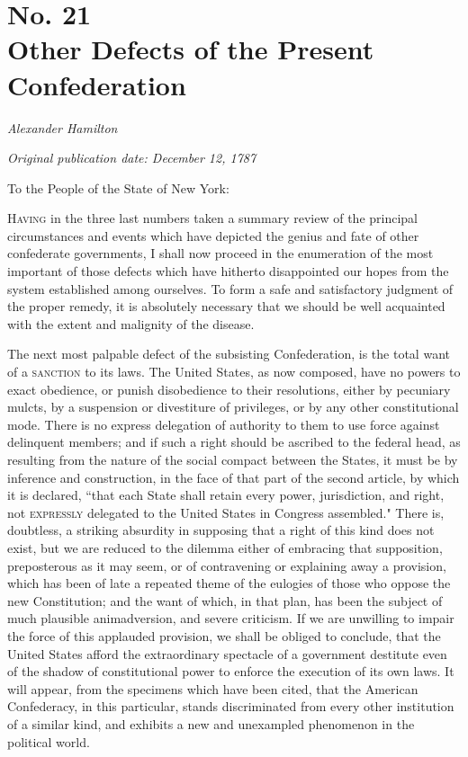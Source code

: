 \chapter[No. 21: Other Defects of the Present Confederation]{No. 21\\ {\small Other Defects of the Present Confederation}}

\textit{Alexander Hamilton}

\textit{Original publication date: December 12, 1787}
\vspace{1cm}

To the People of the State of New York:
\vspace{.4cm}

\textsc{Having} in the three last numbers taken a summary review of the principal circumstances and events which have depicted the genius and fate of other confederate governments, I shall now proceed in the enumeration of the most important of those defects which have hitherto disappointed our hopes from the system established among ourselves. 
To form a safe and satisfactory judgment of the proper remedy, it is absolutely necessary that we should be well acquainted with the extent and malignity of the disease.

The next most palpable defect of the subsisting Confederation, is the total want of a \textsc{sanction} to its laws. 
The United States, as now composed, have no powers to exact obedience, or punish disobedience to their resolutions, either by pecuniary mulcts, by a suspension or divestiture of privileges, or by any other constitutional mode. 
There is no express delegation of authority to them to use force against delinquent members; and if such a right should be ascribed to the federal head, as resulting from the nature of the social compact between the States, it must be by inference and construction, in the face of that part of the second article, by which it is declared, ``that each State shall retain every power, jurisdiction, and right, not \textsc{expressly} delegated to the United States in Congress assembled." There is, doubtless, a striking absurdity in supposing that a right of this kind does not exist, but we are reduced to the dilemma either of embracing that supposition, preposterous as it may seem, or of contravening or explaining away a provision, which has been of late a repeated theme of the eulogies of those who oppose the new Constitution; and the want of which, in that plan, has been the subject of much plausible animadversion, and severe criticism. 
If we are unwilling to impair the force of this applauded provision, we shall be obliged to conclude, that the United States afford the extraordinary spectacle of a government destitute even of the shadow of constitutional power to enforce the execution of its own laws. 
It will appear, from the specimens which have been cited, that the American Confederacy, in this particular, stands discriminated from every other institution of a similar kind, and exhibits a new and unexampled phenomenon in the political world.

